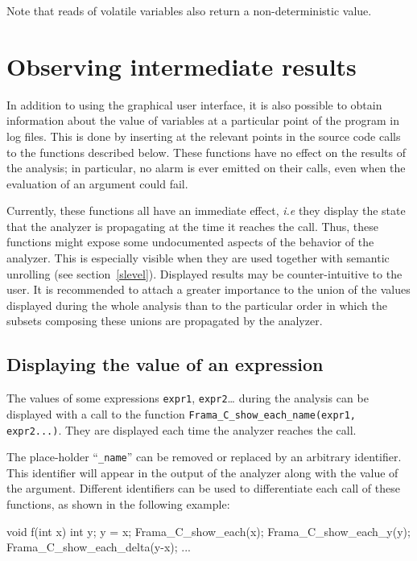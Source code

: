 \documentclass[web]{frama-c-book}
\begin{document}
Note that reads of volatile variables also return a non-deterministic
value.

\section{Observing intermediate results}
\label{buitins_observation}

In addition to using the graphical user interface, it is also possible
to obtain information about the value of variables at a particular
point of the program in log files. This is done by inserting at the
relevant points in the source code calls to the functions described below.
These functions have no effect on the results of the analysis; in particular,
no alarm is ever emitted on their calls, even when the evaluation of an
argument could fail.

Currently, these functions all have an immediate effect, {\it i.e} they display
the state that the analyzer is propagating at the time it reaches the
call. Thus, these functions might expose some undocumented aspects of the
behavior of the analyzer. This is especially visible when they are used together
with semantic unrolling (see section~\ref{slevel}). Displayed results may be
counter-intuitive to the user. It is recommended to attach a greater importance
to the union of the values displayed during the whole analysis than to the
particular order in which the subsets composing these unions are propagated
by the analyzer.

\subsection{Displaying the value of an expression}

The values of some expressions \lstinline|expr1|, \lstinline|expr2|… during the
analysis can be displayed with a call to the function
\lstinline|Frama_C_show_each_name(expr1, expr2...)|. They are displayed each
time the analyzer reaches the call.

The place-holder ``\lstinline|_name|'' can be removed or replaced by an arbitrary
identifier.  This identifier will appear in the output of the analyzer along
with the value of the argument. Different identifiers can be used to
differentiate each call of these functions, as shown in the following example:

\begin{listing-nonumber}
void f(int x)
{
  int y;
  y = x;
  Frama_C_show_each(x);
  Frama_C_show_each_y(y);
  Frama_C_show_each_delta(y-x);
  ...
}
\end{listing-nonumber}
\end{document}
